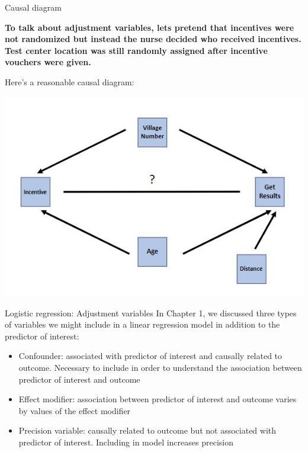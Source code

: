 \documentclass[10pt,t]{beamer}
\begin{document}
\begin{frame}{Causal diagram}
	
		
	\textbf{To talk about adjustment variables, lets pretend that incentives were not randomized but instead the nurse decided who received incentives. Test center location was still randomly assigned after incentive vouchers were given.}
	
\medskip
	
	Here's a reasonable causal diagram:
	\begin{center}
		\includegraphics[width=\textwidth]{./figs/HIV_dag}
	\end{center}
	
\end{frame}


\begin{frame}{Logistic regression: Adjustment variables}
	In Chapter 1, we discussed three types of variables we might include in a linear regression model in addition to the predictor of interest:
	\begin{itemize}
		\item Confounder: associated with predictor of interest and causally related to outcome. Necessary to include in order to understand the association between predictor of interest and outcome
		\item Effect modifier: association between predictor of interest and outcome varies by values of the effect modifier 
		\item Precision variable: causally related to outcome but not associated with predictor of interest. Including in model increases precision
	\end{itemize}
\end{frame}
\end{document}
